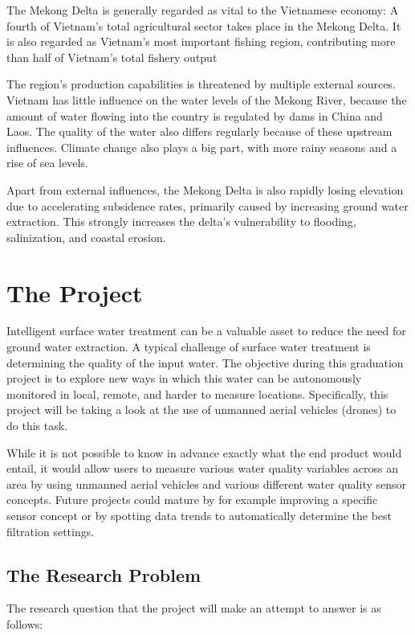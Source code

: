 \documentclass[11pt, a4paper]{article}
\begin{document}
The Mekong Delta is generally regarded as vital to the Vietnamese economy: A fourth of Vietnam's total agricultural sector takes place in the Mekong Delta. It is also regarded as Vietnam's most important fishing region, contributing more than half of Vietnam's total fishery output \cite{vietstats}

The region's production capabilities is threatened by multiple external sources. Vietnam has little influence on the water levels of the Mekong River, because the amount of water flowing into the country is regulated by dams in China and Laos. The quality of the water also differs regularly because of these upstream influences. Climate change also plays a big part, with more rainy seasons and a rise of sea levels. \cite{wur}

Apart from external influences, the Mekong Delta is also rapidly losing elevation due to accelerating subsidence rates, primarily caused by increasing ground water extraction. This strongly increases the delta’s vulnerability to flooding, salinization, and coastal erosion. \cite{minderhoud2020}
\pagebreak
\section{The Project}
Intelligent surface water treatment can be a valuable asset to reduce the need for ground water extraction. A typical challenge of surface water treatment is determining the quality of the input water. The objective during this graduation project is to explore new ways in which this water can be autonomously monitored in local, remote, and harder to measure locations. Specifically, this project will be taking a look at the use of unmanned aerial vehicles (drones) to do this task. 

While it is not possible to know in advance exactly what the end product would entail, it would allow users to measure various water quality variables across an area by using unmanned aerial vehicles and various different water quality sensor concepts. Future projects could mature by for example improving a specific sensor concept or by spotting data trends to automatically determine the best filtration settings.

\subsection{The Research Problem}

The research question that the project will make an attempt to answer is as follows:\vspace{3mm}
\end{document}
